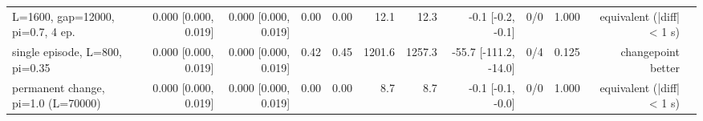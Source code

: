\begin{table}[t]
{\begin{tabular}{lrrrrrrrrrrl}
L=1600, gap=12000, pi=0.7, 4 ep. & 0.000 [0.000, 0.019] & 0.000 [0.000, 0.019] & 0.00 & 0.00 & 12.1 & 12.3 & -0.1 [-0.2, -0.1] & 0/0 & 1.000 & equivalent (|diff| < 1 s) \\
single episode, L=800, pi=0.35 & 0.000 [0.000, 0.019] & 0.000 [0.000, 0.019] & 0.42 & 0.45 & 1201.6 & 1257.3 & -55.7 [-111.2, -14.0] & 0/4 & 0.125 & changepoint better \\
permanent change, pi=1.0 (L=70000) & 0.000 [0.000, 0.019] & 0.000 [0.000, 0.019] & 0.00 & 0.00 & 8.7 & 8.7 & -0.1 [-0.1, -0.0] & 0/0 & 1.000 & equivalent (|diff| < 1 s) \\
\bottomrule
\end{tabular}}
\end{table}
